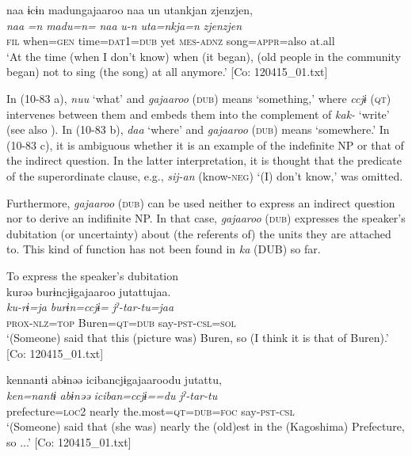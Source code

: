   \ex  %
      \glll    naa  ɨcɨn  madungajaaroo  naa  un  utankjan  {\textbar}zjenzjen{\textbar},\\
      \textit{naa}  \textit{=n}  \textit{madu=n=}  \textit{naa}  \textit{u-n}  \textit{uta=nkja=n} \textit{zjenzjen}\\
      \textsc{fil}  when=\textsc{gen}  time=\textsc{dat}1=\textsc{dub}  yet  \textsc{mes}-\textsc{adnz}  song=\textsc{appr}=also  at.all\\
      \glt       ‘At the time (when I don’t know) when (it began), (old people in the community began) not to sing (the song) at all anymore.’ [Co: 120415\_01.txt]
    \z
\z

In (10-83 a), \textit{nuu} ‘what’ and \textit{gajaaroo} (\textsc{dub}) means ‘something,’ where \textit{ccjɨ} (\textsc{qt}) intervenes between them and embeds them into the complement of \textit{kak-} ‘write’ (see also ). In (10-83 b), \textit{daa} ‘where’ and \textit{gajaaroo} (\textsc{dub}) means ‘somewhere.’ In (10-83 c), it is ambiguous whether it is an example of the indefinite NP or that of the indirect question. In the latter interpretation, it is thought that the predicate of the superordinate clause, e.g., \textit{sij-an} (know-\textsc{neg}) ‘(I) don’t know,’ was omitted.

Furthermore, \textit{gajaaroo} (\textsc{dub}) can be used neither to express an indirect question nor to derive an indifinite NP. In that case, \textit{gajaaroo} (\textsc{dub}) expresses the speaker’s dubitation (or uncertainty) about (the referents of) the units they are attached to. This kind of function has not been found in \textit{ka} (DUB) so far.

\ea\label{ex:10.84}   To express the speaker’s dubitation\\
  \ea  %
      \glll    kurəə  burɨncjɨgajaaroo  jutattujaa.\\
      \textit{ku-rɨ=ja}  \textit{burɨn=ccjɨ=}  \textit{jˀ-tar-tu=jaa}\\
      \textsc{prox}-\textsc{nlz}=\textsc{top}  Buren=\textsc{qt}=\textsc{dub}  say-\textsc{pst}-\textsc{csl}=\textsc{sol}\\
      \glt       ‘(Someone) said that this (picture was) Buren, so (I think it is that of Buren).’ [Co: 120415\_01.txt]

  \ex  %
      \glll    {\textbar}ken{\textbar}nantɨ  abɨnəə  {\textbar}iciban{\textbar}cjɨgajaaroodu  jutattu,\\
      \textit{ken=nantɨ}  \textit{abɨnəə}  \textit{iciban=ccjɨ==du}  \textit{jˀ-tar-tu}\\
      prefecture=\textsc{loc}2  nearly  the.most=\textsc{qt}=\textsc{dub}=\textsc{foc}  say-\textsc{pst}-\textsc{csl}\\
      \glt       ‘(Someone) said that (she was) nearly the (old)est in the (Kagoshima) Prefecture, so ...’ [Co: 120415\_01.txt]


